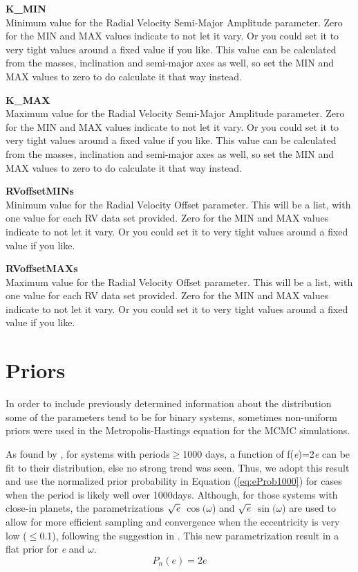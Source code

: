 \documentclass[12pt,preprint]{aastex}
\begin{document}
{\bf K\_MIN}\\
Minimum value for the Radial Velocity Semi-Major Amplitude parameter.
Zero for the MIN and MAX values indicate to not let it vary.  Or you could set it to very tight values around a fixed value if you like.  This value can be calculated from the masses, inclination and semi-major axes as well, so set the MIN and MAX values to zero to do calculate it that way instead.

{\bf K\_MAX}\\
Maximum value for the Radial Velocity Semi-Major Amplitude parameter.
Zero for the MIN and MAX values indicate to not let it vary.  Or you could set it to very tight values around a fixed value if you like.  This value can be calculated from the masses, inclination and semi-major axes as well, so set the MIN and MAX values to zero to do calculate it that way instead.

{\bf RVoffsetMINs}\\
Minimum value for the Radial Velocity Offset parameter.  This will be a list, with one value for each RV data set provided.
Zero for the MIN and MAX values indicate to not let it vary.  Or you could set it to very tight values around a fixed value if you like.

{\bf RVoffsetMAXs}\\
Maximum value for the Radial Velocity Offset parameter.  This will be a list, with one value for each RV data set provided.
Zero for the MIN and MAX values indicate to not let it vary.  Or you could set it to very tight values around a fixed value if you like.



\section{Priors}\label{sec:priors}

In order to include previously determined information about the distribution some of the parameters tend to be for binary systems, sometimes non-uniform priors were used in the Metropolis-Hastings equation for the MCMC simulations.

As found by \citet{duquennoy1991}, for systems with periods$\geq$1000 days, a function of f({\it e})=2{\it e} can be fit to their distribution, else no strong trend was seen.  Thus, we adopt this result and use the normalized prior probability in Equation (\ref{eq:eProb1000}) for cases when the period is likely well over 1000days.  Although, for those systems with close-in planets, the parametrizations $\sqrt{{\it e}}$ $\cos(\omega$) and $\sqrt{{\it e}}$ $\sin(\omega$) are used to allow for more efficient sampling and convergence when the eccentricity is very low ($\le$0.1), following the suggestion in \citet{albrecht2012}. This new parametrization result in a flat prior for {\it e} and $\omega$.
\begin{equation}\label{eq:eProb1000}
P_n(e) =  2e
\end{equation}
\end{document}
